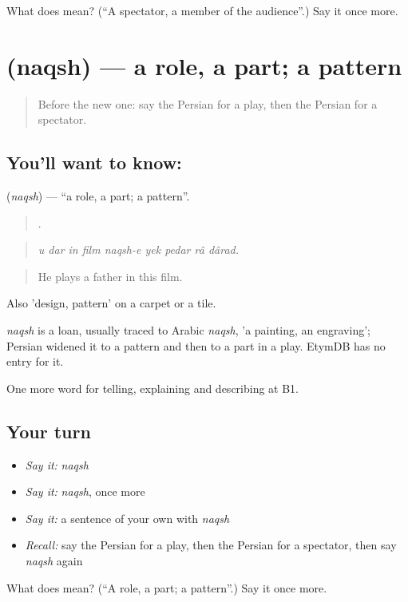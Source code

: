 \begin{tcolorbox}[breakable,colback=teal!4,colframe=teal!35!black,title={Before you move on}]
What does  mean? (\textquotedblleft{}A spectator, a member of the audience\textquotedblright{}.) Say it once more.
\end{tcolorbox}
\section[\texorpdfstring{\fa{نقش} (naqsh)}{نقش (naqsh)}]{ (naqsh) — a role, a part; a pattern}

\label{lesson:FA-C523-naqsh}



\begin{quote}
Before the new one: say the Persian for a play, then the Persian for a spectator.
\end{quote}

\subsection*{You'll want to know: }
\textbf{} (\emph{naqsh}) — \textquotedblleft{}a role, a part; a pattern\textquotedblright{}.

\begin{quote}
        .
\end{quote}

\begin{quote}
\emph{u dar in film naqsh-e yek pedar râ dârad.}
\end{quote}

\begin{quote}
He plays a father in this film.
\end{quote}

Also 'design, pattern' on a carpet or a tile.

\begin{cousinweb}
\emph{naqsh} is a loan, usually traced to Arabic \emph{naqsh}, 'a painting, an engraving'; Persian widened it to a pattern and then to a part in a play. EtymDB has no entry for it.
\end{cousinweb}

\begin{grammarlens}[title={What you've built}]
One more word for telling, explaining and describing at B1.
\end{grammarlens}

\subsection*{Your turn}
\begin{itemize}
\raggedright
  \item \emph{Say it:} \emph{naqsh}
  \item \emph{Say it:} \emph{naqsh}, once more
  \item \emph{Say it:} a sentence of your own with \emph{naqsh}
  \item \emph{Recall:} say the Persian for a play, then the Persian for a spectator, then say \emph{naqsh} again
\end{itemize}

\begin{tcolorbox}[breakable,colback=teal!4,colframe=teal!35!black,title={Before you move on}]
What does  mean? (\textquotedblleft{}A role, a part; a pattern\textquotedblright{}.) Say it once more.
\end{tcolorbox}
